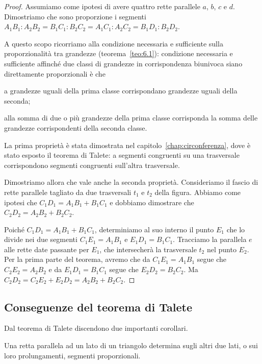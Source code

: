 \begin{proof}
Assumiamo come ipotesi di avere quattro rette parallele $a$, $b$, $c$ e $d$. Dimostriamo che sono proporzione i segmenti 
$A_1B_1 : A_2B_2 = B_1C_1 : B_2C_2 = A_1C_1 : A_2C_2 = B_1D_1 : B_2D_2$.

\begin{figure*}[!htb]
	\centering	
\end{figure*}

A questo scopo ricorriamo alla condizione necessaria e sufficiente sulla proporzionalità tra grandezze (teorema~\ref{teo:6.1}):
condizione necessaria e sufficiente affinché due classi di grandezze in corrispondenza biunivoca siano direttamente proporzionali è che
\begin{itemize*}
\item a grandezze uguali della prima classe corrispondano grandezze uguali della seconda;
\item alla somma di due o più grandezze della prima classe corrisponda la somma delle grandezze corrispondenti della seconda classe.
\end{itemize*}

La prima proprietà è stata dimostrata nel capitolo~\ref{chap:circonferenza}, dove è stato esposto il teorema di Talete: a segmenti congruenti su una trasversale corrispondono segmenti congruenti sull'altra trasversale.

Dimostriamo allora che vale anche la seconda proprietà.
Consideriamo il fascio di rette parallele tagliato da due trasversali $t_1$ e $t_2$ della figura.
Abbiamo come ipotesi che $C_1D_1 = A_1B_1 + B_1C_1$ e dobbiamo dimostrare che $C_2D_2 = A_2B_2 + B_2C_2$.

Poiché $C_1D_1 = A_1B_1 + B_1C_1$, determiniamo al suo interno il punto $E_1$ che lo divide nei due segmenti $C_1E_1=A_1B_1$ e $E_1D_1=B_1C_1$. Tracciamo la parallela $e$ alle rette date passante per $E_1$, che intersecherà la trasversale $t_2$ nel punto $E_2$. Per la prima parte del teorema, avremo che da $C_1E_1=A_1B_1$ segue che $C_2E_2 = A_2B_2$ e da $E_1D_1 = B_1C_1$ segue che $E_2D_2=B_2C_2$. Ma $C_2D_2=C_2E_2 + E_2D_2 = A_2B_2 + B_2C_2$.
\end{proof}

\subsection{Conseguenze del teorema di Talete}

Dal teorema di Talete discendono due importanti corollari.
\begin{corollario}\label{cor:6.1}
Una retta parallela ad un lato di un triangolo determina sugli altri due lati, o sui loro prolungamenti, segmenti proporzionali.
\end{corollario}

